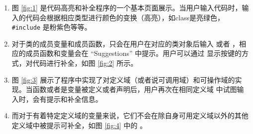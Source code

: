\begin{enumerate}[label=(\alph*)]
    \item 图 \ref{fig:1} 是代码高亮和补全程序的一个基本页面展示。当用户输入代码时，输入的代码会根据相应类型进行颜色的变换（高亮），如class是亮绿色，\lstinline`#include` 是粉紫色等等。
    \item 对于类的成员变量和成员函数，只会在用户在对应的类对象后输入  或者 \code{->}，相应的成员函数和变量会在 “Suggestions” 中提示。用户可以通过  显示按键的方式，对代码进行补全，如图 \ref{fig:2} 所示。
    \item 图 \ref{fig:3} 展示了程序中实现了对定义域（或者说可调用域）和可操作域的实现。当函数或者是变量被定义或者声明后，用户再次在相同定义域  中试图输入时，会有提示和补全信息。
    \item 而对于有着特定定义域的变量来说，它们不会在除自身可用定义域以外的其他定义域中被提示可补全，如图 \ref{fig:4} 中的 。
\end{enumerate}